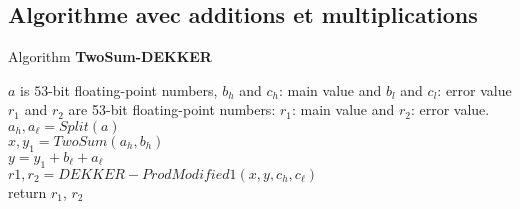 \subsection{Algorithme avec additions et multiplications}

\begin{algorithm}[htbp]
  \caption{Algorithm \textbf{TwoSum-DEKKER}}
\begin{algorithmic}[1]
\Input $a$ is $53$-bit floating-point numbers, $b_h$ and $c_h$: main value and  $b_l$ and $c_l$: error value
\Output $r_1$ and $r_2$ are 53-bit floating-point numbers: $r_1$: main value and $r_2$: error value.
\State $a_h, a_{\ell} =Split(a)$\\
    $x, y_1 = TwoSum(a_h, b_h)$\\
    $y = y_1+b_{\ell}+a_{\ell}$\\
    $r1,r_2 =DEKKER-ProdModified1(x, y, c_h, c_{\ell})$\\
    return $r_1$, $r_2$
\end{algorithmic}
\end{algorithm}



